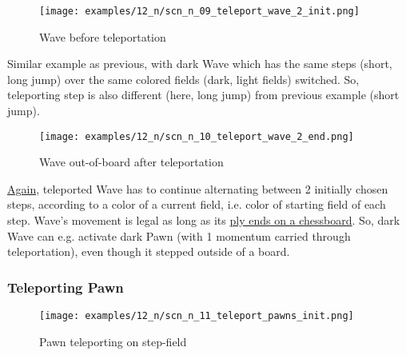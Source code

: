 \vspace*{-1.0\baselineskip}
\noindent
\begin{figure}[!h]
\texttt{[image: examples/12\_n/scn\_n\_09\_teleport\_wave\_2\_init.png]}
\caption{Wave before teleportation}
\label{fig:scn_n_09_teleport_wave_2_init}
\end{figure}

Similar example as previous, with dark Wave which has the same steps (short,
long jump) over the same colored fields (dark, light fields) switched. So,
teleporting step is also different (here, long jump) from previous example
(short jump).

\clearpage %

\vspace*{-2.0\baselineskip}
\noindent
\begin{figure}[!h]
\texttt{[image: examples/12\_n/scn\_n\_10\_teleport\_wave\_2\_end.png]}
\caption{Wave out-of-board after teleportation}
\label{fig:scn_n_10_teleport_wave_2_end}
\end{figure}

\hyperref[fig:scn_n_08_teleport_wave_end]{Again},
teleported Wave has to continue alternating between 2 initially chosen steps,
according to a color of a current field, i.e. color of starting field of each
step. Wave's movement is legal as long as its
\hyperref[fig:scn_mv_30_wave_off_board]{ply ends on a chessboard}. So, dark
Wave can e.g. activate dark Pawn (with 1 momentum carried through teleportation),
even though it stepped outside of a board.

\clearpage %

\subsubsection*{Teleporting Pawn}
\label{sec:Nineteen/Star/Teleporting pieces/Teleporting Pawn}

\vspace*{-1.4\baselineskip}
\noindent
\begin{figure}[!h]
\texttt{[image: examples/12\_n/scn\_n\_11\_teleport\_pawns\_init.png]}
\caption{Pawn teleporting on step-field}
\label{fig:scn_n_11_teleport_pawns_init}
\end{figure}

